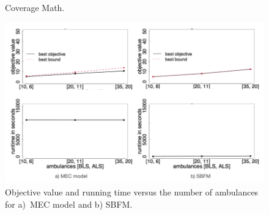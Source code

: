 \begin{figure}[H]
%
\hspace{0.4cm}%
\vspace{0.4cm}
\caption{Coverage Math.}
\label{Cov_Math}
\end{figure}




\begin{figure}[htb]
    \centering
    \includegraphics[width=0.9\linewidth]{AmbComp.png}
    \caption{Objective value and running time versus the number of ambulances for a)~MEC model and b) SBFM.}
    \label{fig:amb}
\end{figure}

